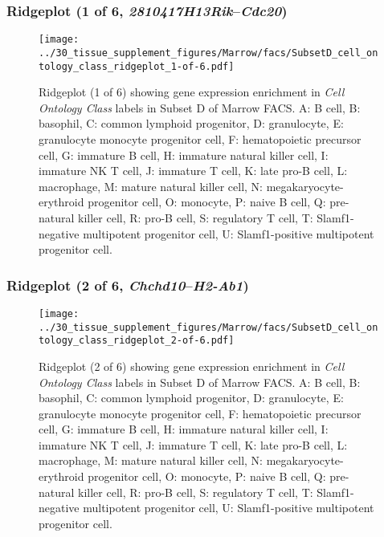 \subsubsection{Ridgeplot (1 of 6, \emph{2810417H13Rik}--\emph{Cdc20})}
\begin{figure}[h]
\centering
\texttt{[image: ../30\_tissue\_supplement\_figures/Marrow/facs/SubsetD\_cell\_ontology\_class\_ridgeplot\_1-of-6.pdf]}

\caption{ Ridgeplot (1 of 6)  showing gene expression enrichment in \emph{Cell Ontology Class} labels in Subset D of Marrow FACS. A: B cell, B: basophil, C: common lymphoid progenitor, D: granulocyte, E: granulocyte monocyte progenitor cell, F: hematopoietic precursor cell, G: immature B cell, H: immature natural killer cell, I: immature NK T cell, J: immature T cell, K: late pro-B cell, L: macrophage, M: mature natural killer cell, N: megakaryocyte-erythroid progenitor cell, O: monocyte, P: naive B cell, Q: pre-natural killer cell, R: pro-B cell, S: regulatory T cell, T: Slamf1-negative multipotent progenitor cell, U: Slamf1-positive multipotent progenitor cell.}
\end{figure}


\clearpage

\subsubsection{Ridgeplot (2 of 6, \emph{Chchd10}--\emph{H2-Ab1})}
\begin{figure}[h]
\centering
\texttt{[image: ../30\_tissue\_supplement\_figures/Marrow/facs/SubsetD\_cell\_ontology\_class\_ridgeplot\_2-of-6.pdf]}

\caption{ Ridgeplot (2 of 6)  showing gene expression enrichment in \emph{Cell Ontology Class} labels in Subset D of Marrow FACS. A: B cell, B: basophil, C: common lymphoid progenitor, D: granulocyte, E: granulocyte monocyte progenitor cell, F: hematopoietic precursor cell, G: immature B cell, H: immature natural killer cell, I: immature NK T cell, J: immature T cell, K: late pro-B cell, L: macrophage, M: mature natural killer cell, N: megakaryocyte-erythroid progenitor cell, O: monocyte, P: naive B cell, Q: pre-natural killer cell, R: pro-B cell, S: regulatory T cell, T: Slamf1-negative multipotent progenitor cell, U: Slamf1-positive multipotent progenitor cell.}
\end{figure}


\clearpage

